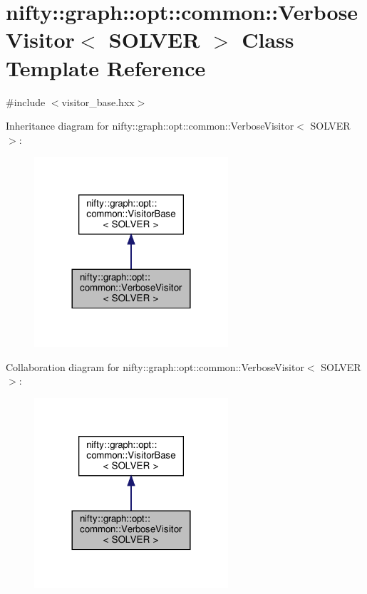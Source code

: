 \hypertarget{classnifty_1_1graph_1_1opt_1_1common_1_1VerboseVisitor}{}\section{nifty\+:\+:graph\+:\+:opt\+:\+:common\+:\+:Verbose\+Visitor$<$ S\+O\+L\+V\+ER $>$ Class Template Reference}
\label{classnifty_1_1graph_1_1opt_1_1common_1_1VerboseVisitor}


{\ttfamily \#include $<$visitor\+\_\+base.\+hxx$>$}



Inheritance diagram for nifty\+:\+:graph\+:\+:opt\+:\+:common\+:\+:Verbose\+Visitor$<$ S\+O\+L\+V\+ER $>$\+:
\nopagebreak
\begin{figure}[H]
\begin{center}
\leavevmode
\includegraphics[width=204pt]{classnifty_1_1graph_1_1opt_1_1common_1_1VerboseVisitor__inherit__graph}
\end{center}
\end{figure}


Collaboration diagram for nifty\+:\+:graph\+:\+:opt\+:\+:common\+:\+:Verbose\+Visitor$<$ S\+O\+L\+V\+ER $>$\+:
\nopagebreak
\begin{figure}[H]
\begin{center}
\leavevmode
\includegraphics[width=204pt]{classnifty_1_1graph_1_1opt_1_1common_1_1VerboseVisitor__coll__graph}
\end{center}
\end{figure}
